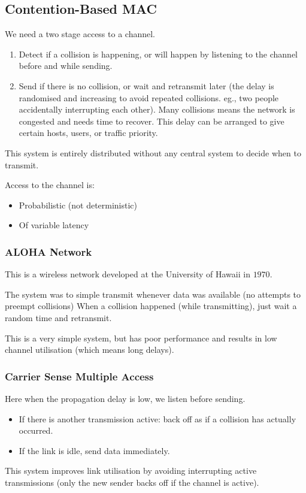 \subsection{Contention-Based MAC}\label{sub:contention_based_mac}

We need a two stage access to a channel.
\begin{enumerate}
	\item Detect if a collision is happening, or will happen by listening to the channel before and while sending.
	\item Send if there is no collision, or wait and retransmit later (the delay is randomised and increasing to avoid repeated collisions. eg., two people accidentally interrupting each other).
	      Many collisions means the network is congested and needs time to recover.
	      This delay can be arranged to give certain hosts, users, or traffic priority.
\end{enumerate}

\begin{note}
	This system is entirely distributed without any central  system to decide when to transmit.
\end{note}
\noindent
Access to the channel is:
\begin{itemize}
	\item Probabilistic (not deterministic)
	\item Of variable latency
\end{itemize}

\subsubsection{ALOHA Network}\label{ssub:aloha_network}

This is a wireless network developed at the University of Hawaii in \(1970\).

The system was to simple transmit whenever data was available (no attempts to preempt collisions)
When a collision happened (while transmitting), just wait a random time and retransmit.

This is a very simple system, but has poor performance and results in low channel utilisation (which means long delays).

\subsubsection{Carrier Sense Multiple Access}\label{ssub:carrier_sense_multiple_access}

Here when the propagation delay is low, we listen before sending.
\begin{itemize}
	\item If there is another transmission active: back off as if a collision has actually occurred.
	\item If the link is idle, send data immediately.
\end{itemize}
This system improves link utilisation by avoiding interrupting active transmissions (only the new sender backs off if the channel is active).

